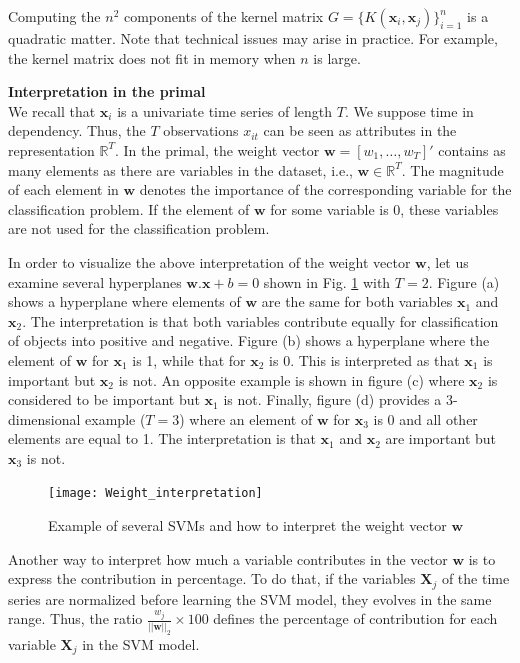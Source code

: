 Computing the $n^2$ components of the kernel matrix $G = \{K(\textbf{x}_i
, \textbf{x}_j)\}_{i=1}^n$ is a quadratic matter. Note that technical issues may arise in practice. For example, the kernel matrix does not fit in memory when $n$ is large.


\noindent \textbf{Interpretation in the primal} \\
We recall that $\textbf{x}_i$ is a univariate time series of length $T$. We suppose time in dependency. Thus, the $T$ observations $x_{it}$ can be seen as attributes in the representation $\mathbb{R}^T$. In the primal, the weight vector $\textbf{w} = [w_1, \ldots, w_T]'$ contains as many elements as there are variables in the dataset, i.e., $\textbf{w} \in \mathbb{R}^T$. The magnitude of each element in $\textbf{w}$ denotes the importance of the corresponding variable for the classification problem. If the element of $\textbf{w}$ for some variable is 0, these variables are not used for the classification problem.

In order to visualize the above interpretation of the weight vector $\textbf{w}$, let us examine several hyperplanes $\textbf{w}.\textbf{x}+b=0$ shown in Fig. \ref*{fig:Weight_interpretation} with $T=2$. Figure (a) shows a hyperplane where elements of $\textbf{w}$ are the same for both variables $\textbf{x}_1$ and $\textbf{x}_2$. The interpretation is that both variables contribute equally for classification of objects into positive and negative. Figure (b) shows a hyperplane where the element of $\textbf{w}$ for $\textbf{x}_1$ is 1, while that for $\textbf{x}_2$ is 0. This is interpreted as that $\textbf{x}_1$ is important but $\textbf{x}_2$ is not. An opposite example is shown in figure (c) where $\textbf{x}_2$ is considered to be important but $\textbf{x}_1$ is not. Finally, figure (d) provides a 3-dimensional example ($T=3$) where an element of $\textbf{w}$ for $\textbf{x}_3$ is 0 and all other elements are equal to 1. The interpretation is that $\textbf{x}_1$ and $\textbf{x}_2$ are important but $\textbf{x}_3$ is not.

\begin{figure}[h!]
	\centering
	\texttt{[image: Weight\_interpretation]}
	\caption{Example of several SVMs and how to interpret the weight vector $\textbf{w}$}
	\label{fig:Weight_interpretation}
\end{figure}

Another way to interpret how much a variable contributes in the vector $\textbf{w}$ is to express the contribution in percentage. To do that, if the variables $\textbf{X}_j$ of the time series are normalized before learning the SVM model, they evolves in the same range. Thus, the ratio $\frac{w_j}{||\textbf{w}||_2} \times 100$ defines the percentage of contribution for each variable $\textbf{X}_j$ in the SVM model.

